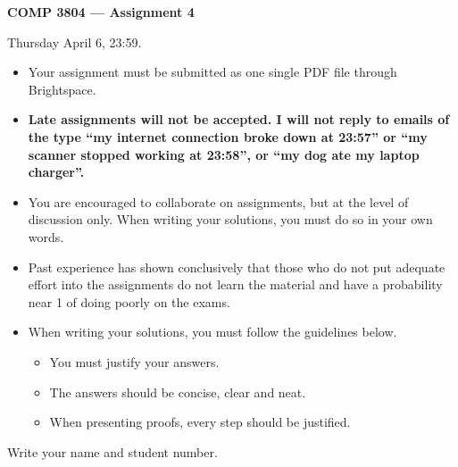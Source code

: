 \documentclass[12pt]{article}
\newcounter{ques}
\newenvironment{question}{\stepcounter{ques}{\noindent\bf Question \arabic{ques}:}}{\vspace{5mm}}
\begin{document}
 

\begin{center} \Large\bf
COMP 3804 --- Assignment 4 
\end{center} 

 Thursday April 6, 23:59.

\vspace{0.5em}

\begin{itemize}
\item Your assignment must be submitted as one single PDF file through
      Brightspace.

\begin{center}
\hfill{}
\end{center}
\item {\bf Late assignments will not be accepted. I will not reply to
      emails of the type ``my internet connection broke down at
      23:57'' or ``my scanner stopped working at 23:58'', or
      ``my dog ate my laptop charger''.}
\item You are encouraged to collaborate on assignments, but at the level
      of discussion only. When writing your solutions, you must do so
      in your own words.
\item Past experience has shown conclusively that those who do not put
      adequate effort into the assignments do not learn the material and
      have a probability near 1 of doing poorly on the exams.
\item When writing your solutions, you must follow the guidelines below.
      \begin{itemize}
      \item You must justify your answers.
      \item The answers should be concise, clear and neat.
      \item When presenting proofs, every step should be justified.
      \end{itemize}
\end{itemize}

\newpage 

\begin{question}
Write your name and student number.
\end{question}
\end{document}

